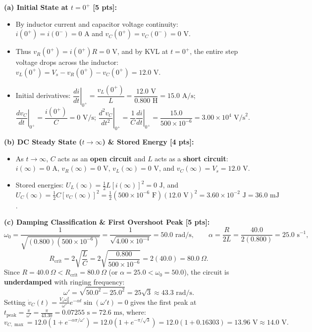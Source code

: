\documentclass[10pt,letterpaper]{article}
\begin{document}
{  \textbf{(a) Initial State at $t = 0^+$ [5 pts]:}
  \begin{itemize}
    \item By inductor current and capacitor voltage continuity: $i(0^+) = i(0^-) = 0\text{ A}$ and $v_C(0^+) = v_C(0^-) = 0\text{ V}$.
    \item Thus $v_R(0^+) = i(0^+) R = 0\text{ V}$, and by KVL at $t = 0^+$, the entire step voltage drops across the inductor: $v_L(0^+) = V_s - v_R(0^+) - v_C(0^+) = 12.0\text{ V}$.
    \item Initial derivatives: $\left.\dfrac{di}{dt}\right|_{0^+} = \dfrac{v_L(0^+)}{L} = \dfrac{12.0\text{ V}}{0.800\text{ H}} = 15.0\text{ A/s}$; $\left.\dfrac{dv_C}{dt}\right|_{0^+} = \dfrac{i(0^+)}{C} = 0\text{ V/s}$; $\left.\dfrac{d^2 v_C}{dt^2}\right|_{0^+} = \dfrac{1}{C}\left.\dfrac{di}{dt}\right|_{0^+} = \dfrac{15.0}{500\times 10^{-6}} = 3.00\times 10^4\text{ V/s}^2$.
  \end{itemize}
  \textbf{(b) DC Steady State ($t \to \infty$) \& Stored Energy [4 pts]:}
  \begin{itemize}
    \item As $t \to \infty$, $C$ acts as an \textbf{open circuit} and $L$ acts as a \textbf{short circuit}: $i(\infty) = 0\text{ A}$, $v_R(\infty) = 0\text{ V}$, $v_L(\infty) = 0\text{ V}$, and $v_C(\infty) = V_s = 12.0\text{ V}$.
    \item Stored energies: $U_L(\infty) = \frac{1}{2}L[i(\infty)]^2 = 0\text{ J}$, and $U_C(\infty) = \frac{1}{2}C[v_C(\infty)]^2 = \frac{1}{2}(500\times 10^{-6}\text{ F})(12.0\text{ V})^2 = 3.60\times 10^{-2}\text{ J} = 36.0\text{ mJ}$.
  \end{itemize}
  \textbf{(c) Damping Classification \& First Overshoot Peak [5 pts]:}
  $$\omega_0 = \frac{1}{\sqrt{(0.800)(500\times 10^{-6})}} = \frac{1}{\sqrt{4.00\times 10^{-4}}} = 50.0\text{ rad/s}, \qquad \alpha = \frac{R}{2L} = \frac{40.0}{2(0.800)} = 25.0\text{ s}^{-1},$$
  $$R_{\text{crit}} = 2\sqrt{\frac{L}{C}} = 2\sqrt{\frac{0.800}{500\times 10^{-6}}} = 2(40.0) = 80.0\ \Omega.$$
  Since $R = 40.0\ \Omega < R_{\text{crit}} = 80.0\ \Omega$ (or $\alpha = 25.0 < \omega_0 = 50.0$), the circuit is \textbf{underdamped} with ringing frequency:
  $$\omega' = \sqrt{50.0^2 - 25.0^2} = 25\sqrt{3} \approx 43.3\text{ rad/s}.$$
  Setting $\dot{v}_C(t) = \frac{V_s \omega_0^2}{\omega'} e^{-\alpha t}\sin(\omega' t) = 0$ gives the first peak at $t_{\text{peak}} = \frac{\pi}{\omega'} = \frac{\pi}{43.30} = 0.07255\text{ s} = 72.6\text{ ms}$, where:
  $$v_{C,\max} = 12.0\left(1 + e^{-\alpha \pi/\omega'}\right) = 12.0\left(1 + e^{-\pi/\sqrt{3}}\right) = 12.0(1 + 0.16303) = 13.96\text{ V} \approx 14.0\text{ V}.$$

}
\end{document}
